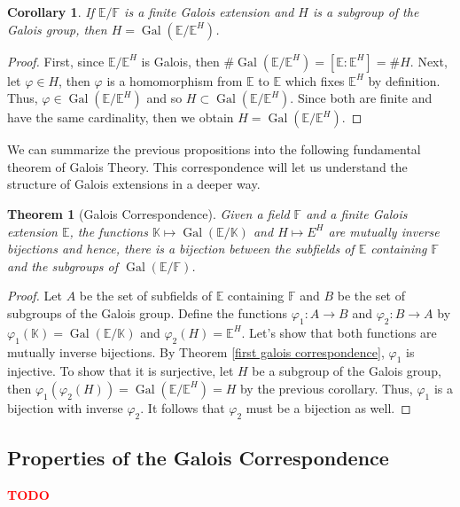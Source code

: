 \documentclass{article}
\theoremstyle{plain}
\newtheorem{theorem}{Theorem}[subsection]
\newtheorem*{corollary}{Corollary}
\theoremstyle{definition}
\newcommand{\F}{\mathbb{F}}
\newcommand{\E}{\mathbb{E}}
\newcommand{\K}{\mathbb{K}}
\DeclareMathOperator{\Gal}{Gal}
\newcommand{\td}{\textcolor{red}{\textbf{TODO}}}
\begin{document}
\begin{corollary}
    If $\E / \F$ is a finite Galois extension and $H$ is a subgroup of the Galois group, then $H = \Gal(\E / \E^H)$.
\end{corollary}

\begin{proof}
    First, since $\E / \E^H$ is Galois, then $\# \Gal(\E / \E^H) = [\E : \E^H] = \# H$. Next, let $\varphi \in H$, then $\varphi$ is a homomorphism from $\E$ to $\E$ which fixes $\E^H$ by definition. Thus, $\varphi \in \Gal(\E / \E^H)$ and so $H \subset \Gal(\E / \E^H)$. Since both are finite and have the same  cardinality, then we obtain $H = \Gal(\E / \E^H)$. 
\end{proof}

We can summarize the previous propositions into the following fundamental theorem of Galois Theory. This correspondence will let us understand the structure of Galois extensions in a deeper way.

\begin{theorem}[Galois Correspondence]
    Given a field $\F$ and a finite Galois extension $\E$, the functions $\K \mapsto \Gal(\E / \K)$ and $H \mapsto E^H$ are mutually inverse bijections and hence, there is a bijection between the subfields of $\E$ containing $\F$ and the subgroups of $\Gal(\E / \F)$.
\end{theorem}

\begin{proof}
    Let $A$ be the set of subfields of $\E$ containing $\F$ and $B$ be the set of subgroups of the Galois group. Define the functions $\varphi_1 : A \to B$ and $\varphi_2 : B \to A$ by $\varphi_1(\K) = \Gal(\E / \K)$ and $\varphi_2(H) = \E^H$. Let's show that both functions are mutually inverse bijections. By Theorem \ref{first galois correspondence}, $\varphi_1$ is injective. To show that it is surjective, let $H$ be a subgroup of the Galois group, then $\varphi_1(\varphi_2(H)) = \Gal(\E / \E^H) = H$ by the previous corollary. Thus, $\varphi_1$ is a bijection with inverse $\varphi_2$. It follows that $\varphi_2$ must be a bijection as well. 
\end{proof}

\subsection{Properties of the Galois Correspondence}

\td 
\end{document}
